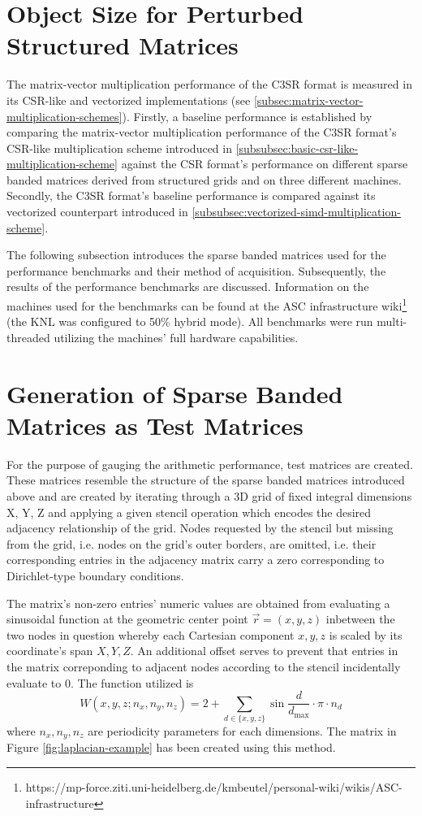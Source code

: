   \section{Object Size for Perturbed Structured Matrices}

  The matrix-vector multiplication performance of the C3SR format is measured in its CSR-like and vectorized implementations (see \ref{subsec:matrix-vector-multiplication-schemes}). Firstly, a baseline performance is established by comparing the matrix-vector multiplication performance of the C3SR format's CSR-like multiplication scheme introduced in \ref{subsubsec:basic-csr-like-multiplication-scheme} against the CSR format's performance on different sparse banded matrices derived from structured grids and on three different machines. Secondly, the C3SR format's baseline performance is compared against its vectorized counterpart introduced in \ref{subsubsec:vectorized-simd-multiplication-scheme}.

  The following subsection introduces the sparse banded matrices used for the performance benchmarks and their method of acquisition. Subsequently, the results of the performance benchmarks are discussed. Information on the machines used for the benchmarks can be found at the ASC infrastructure wiki\footnote{https://mp-force.ziti.uni-heidelberg.de/kmbeutel/personal-wiki/wikis/ASC-infrastructure} (the KNL was configured to 50\% hybrid mode). All benchmarks were run multi-threaded utilizing the machines' full hardware capabilities.

  \section{Generation of Sparse Banded Matrices as Test Matrices}

    For the purpose of gauging the arithmetic performance, test matrices are created. These matrices resemble the structure of the sparse banded matrices introduced above and are created by iterating through a 3D grid of fixed integral dimensions X, Y, Z and applying a given stencil operation which encodes the desired adjacency relationship of the grid. Nodes requested by the stencil but missing from the grid, i.e. nodes on the grid's outer borders, are omitted, i.e. their corresponding entries in the adjacency matrix carry a zero corresponding to Dirichlet-type boundary conditions.

    The matrix's non-zero entries' numeric values are obtained from evaluating a sinusoidal function at the geometric center point $\vec{r} = (x, y, z)$ inbetween the two nodes in question whereby each Cartesian component $x, y, z$ is scaled by its coordinate's span $X, Y, Z$. An additional offset serves to prevent that entries in the matrix correponding to adjacent nodes according to the stencil incidentally evaluate to 0. The function utilized is $$W(x,y,z; n_x, n_y, n_z) = 2 + \sum \limits_{d \in \{x,y,z\}} \sin{\frac{d}{d_{\text{max}}} \cdot \pi \cdot n_d} $$ where $n_x, n_y, n_z$ are periodicity parameters for each dimensions. The matrix in Figure \ref{fig:laplacian-example} has been created using this method.

